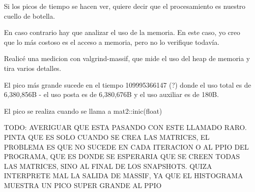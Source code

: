Si los picos de tiempo se hacen ver, quiere decir que el procesamiento es nuestro cuello de botella.

En caso contrario hay que analizar el uso de la memoria.
En este caso, yo creo que lo más costoso es el acceso a memoria, pero no lo verifique todavía.

Realicé una medicion con valgrind-massif, que mide el uso del heap de memoria y tira varios detalles.

El pico más grande sucede en el tiempo 109995366147 (?) donde el uso total es de 6,380,856B - el uso posta es de 6,380,676B y el uso auxiliar es de 180B.

El pico se realiza cuando se llama a mat2::inic(float)

TODO: AVERIGUAR QUE ESTA PASANDO CON ESTE LLAMADO RARO. PINTA QUE ES SOLO CUANDO SE CREA LAS MATRICES, EL PROBLEMA ES QUE NO SUCEDE EN CADA ITERACION O AL PPIO DEL PROGRAMA, QUE ES DONDE SE ESPERARIA QUE SE CREEN TODAS LAS MATRICES, SINO AL FINAL DE LOS SNAPSHOTS. QUIZA INTERPRETE MAL LA SALIDA DE MASSIF, YA QUE EL HISTOGRAMA MUESTRA UN PICO SUPER GRANDE AL PPIO
